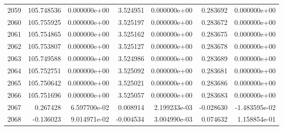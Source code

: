 \begin{tabular}{rrrrrrr}
2059 & 105.748536 &  0.000000e+00 &  3.524951 &  0.000000e+00 &    0.283692 &  0.000000e+00 \\
2060 & 105.755925 &  0.000000e+00 &  3.525197 &  0.000000e+00 &    0.283672 &  0.000000e+00 \\
2061 & 105.754865 &  0.000000e+00 &  3.525162 &  0.000000e+00 &    0.283675 &  0.000000e+00 \\
2062 & 105.753807 &  0.000000e+00 &  3.525127 &  0.000000e+00 &    0.283678 &  0.000000e+00 \\
2063 & 105.749588 &  0.000000e+00 &  3.524986 &  0.000000e+00 &    0.283689 &  0.000000e+00 \\
2064 & 105.752751 &  0.000000e+00 &  3.525092 &  0.000000e+00 &    0.283681 &  0.000000e+00 \\
2065 & 105.750642 &  0.000000e+00 &  3.525021 &  0.000000e+00 &    0.283686 &  0.000000e+00 \\
2066 & 105.751696 &  0.000000e+00 &  3.525057 &  0.000000e+00 &    0.283683 &  0.000000e+00 \\
2067 &   0.267428 &  6.597700e-02 &  0.008914 &  2.199233e-03 &   -0.028630 & -1.483595e-02 \\
2068 &  -0.136023 &  9.014971e-02 & -0.004534 &  3.004990e-03 &    0.074632 &  1.158854e-01 \\
\bottomrule
\end{tabular}
